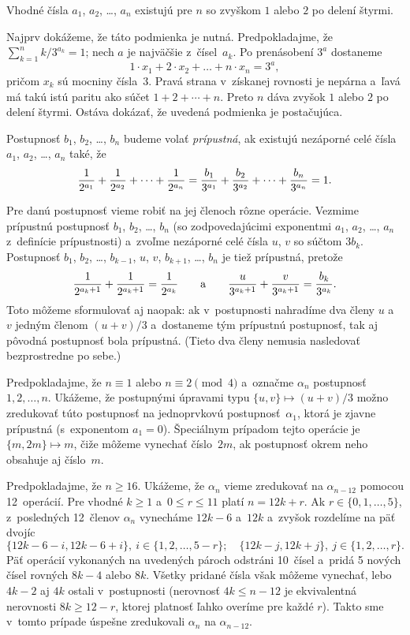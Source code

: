 {%
Vhodné čísla $a_1$, $a_2$, \dots, $a_n$ existujú pre $n$ so zvyškom $1$ alebo $2$ po delení štyrmi.

Najprv dokážeme, že táto podmienka je nutná. Predpokladajme, že $\sum_{k=1}^n k/3^{a_k} = 1$; nech $a$ je najväčšie z~čísel~$a_k$.
Po prenásobení $3^a$ dostaneme
$$
1\cdot x_1 + 2\cdot x_2 + \dots + n\cdot x_n = 3^a,
$$
pričom $x_k$ sú mocniny čísla~$3$.
Pravá strana v~získanej rovnosti je nepárna a~ľavá má takú istú paritu ako súčet $1+2+\cdots+n$. Preto $n$ dáva zvyšok $1$ alebo $2$ po delení štyrmi.
Ostáva dokázať, že uvedená podmienka je postačujúca.

Postupnosť $b_1$, $b_2$, \dots, $b_n$ budeme volať {\it prípustná}, ak existujú nezáporné celé čísla $a_1$, $a_2$, \dots, $a_n$ také, že
$$
{1\over 2^{a_1}}+{1\over 2^{a_2}}+\dots+{1\over 2^{a_n}} = {b_1\over 3^{a_1}}+{b_2\over 3^{a_2}}+\dots+{b_n\over 3^{a_n}} = 1.
$$

Pre danú postupnosť vieme robiť na jej členoch rôzne operácie. Vezmime prípustnú postupnosť $b_1$, $b_2$, \dots, $b_n$ (so zodpovedajúcimi exponentmi $a_1$, $a_2$, \dots, $a_n$ z~definície prípustnosti) a~zvoľme nezáporné celé čísla $u$, $v$ so súčtom $3b_k$. Postupnosť $b_1$, $b_2$, \dots, $b_{k-1}$, $u$, $v$, $b_{k+1}$, \dots, $b_n$ je tiež prípustná, pretože
$$
{1\over 2^{a_k+1}}+{1\over 2^{a_k+1}} = {1\over 2^{a_k}}\qquad\text{a}\qquad {u\over 3^{a_k+1}}+{v\over 3^{a_k+1}}={b_k\over 3^{a_k}}.
$$
Toto môžeme sformulovať aj naopak: ak v~postupnosti nahradíme dva členy $u$ a~$v$ jedným členom $(u+v)/3$ a~dostaneme tým prípustnú postupnosť, tak aj pôvodná postupnosť bola prípustná. (Tieto dva členy nemusia nasledovať bezprostredne po sebe.)

Predpokladajme, že $n\equiv 1$ alebo $n\equiv2\pmod 4$ a~označme $\alpha_n$ postupnosť $1, 2, \dots, n$.
Ukážeme, že postupnými úpravami typu $\{u,v\}\mapsto (u+v)/3$ možno zredukovať túto postupnosť na jednoprvkovú postupnosť~$\alpha_1$, ktorá je zjavne prípustná (s~exponentom $a_1=0$).
Špeciálnym prípadom tejto operácie je $\{m,2m\}\mapsto m$, čiže môžeme vynechať číslo~$2m$, ak postupnosť okrem neho obsahuje aj číslo~$m$.

Predpokladajme, že $n\ge 16$. Ukážeme, že $\alpha_n$ vieme zredukovať na $\alpha_{n-12}$ pomocou 12~operácií. Pre vhodné $k\ge 1$ a~$0\le r\le 11$ platí $n=12k+r$.
Ak $r\in\{0,1,\dots,5\}$, z~posledných 12~členov $\alpha_n$ vynecháme $12k-6$ a~$12k$ a~zvyšok rozdelíme na päť dvojíc
$$
\{12k-6-i, 12k-6+i\},\ i\in\{1,2,\dots,5-r\};\quad \{12k-j, 12k+j\}, \ j\in\{1,2,\dots,r\}.
$$
Päť operácií vykonaných na uvedených pároch odstráni 10~čísel a~pridá 5 nových čísel rovných $8k-4$ alebo $8k$.
Všetky pridané čísla však môžeme vynechať, lebo $4k-2$ aj $4k$ ostali v~postupnosti (nerovnosť $4k\le n-12$ je ekvivalentná nerovnosti $8k\ge {12-r}$,
ktorej platnosť ľahko overíme pre každé $r$). Takto sme v~tomto prípade úspešne zredukovali $\alpha_n$ na $\alpha_{n-12}$.

}
